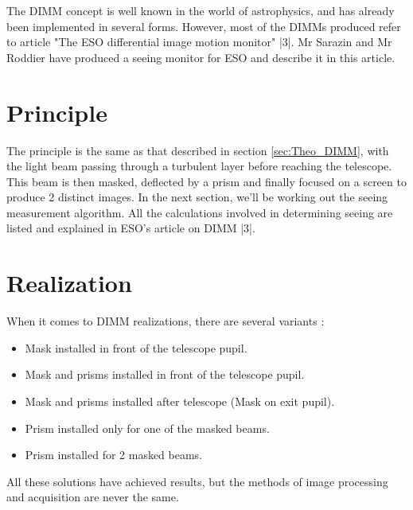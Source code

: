 The \Gls{DIMM} concept is well known in the world of astrophysics, and has already been implemented in several forms.
However, most of the \Gls{DIMM}s produced refer to article "The ESO differential image motion monitor" |3|.
Mr Sarazin and Mr Roddier have produced a seeing monitor for ESO and describe it in this article.

\section{Principle}
The principle is the same as that described in section \ref{sec:Theo_DIMM}, with the light beam passing through a turbulent layer
before reaching the telescope. This beam is then masked, deflected by a prism and finally focused on a screen to produce
2 distinct images. In the next section, we'll be working out the seeing measurement algorithm. All the calculations involved
in determining seeing are listed and explained in ESO's article on DIMM |3|.
\section{Realization}
When it comes to \Gls{DIMM} realizations, there are several variants :
\begin{itemize}
    \item Mask installed in front of the telescope pupil.
    \item Mask and prisms installed in front of the telescope pupil.
    \item Mask and prisms installed after telescope (Mask on exit pupil).
    \item Prism installed only for one of the masked beams.
    \item Prism installed for 2 masked beams.
\end{itemize}
All these solutions have achieved results, but the methods of image processing and acquisition are never the same.
\newpage
